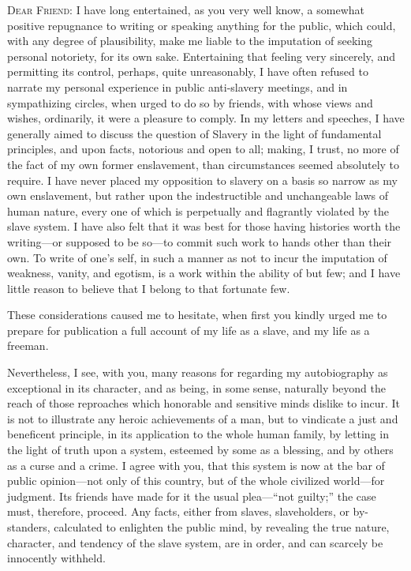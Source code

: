 \textsc{Dear Friend}: I have long entertained, as you very well know, a
somewhat positive repugnance to writing or speaking anything for the
public, which could, with any degree of plausibility, make me liable to
the imputation of seeking personal notoriety, for its own sake.
Entertaining that feeling very sincerely, and permitting its control,
perhaps, quite unreasonably, I have often refused to narrate my personal
experience in public anti-slavery meetings, and in sympathizing circles,
when urged to do so by friends, with whose views and wishes, ordinarily,
it were a pleasure to comply. In my letters and speeches, I have
generally aimed to discuss the question of Slavery in the light of
fundamental principles, and upon facts, notorious and open to all;
making, I trust, no more of the fact of my own former enslavement, than
circumstances seemed absolutely to require. I have never placed my
opposition to slavery on a basis so narrow as my own enslavement, but
rather upon the indestructible and unchangeable laws of human nature,
every one of which is perpetually and flagrantly violated by the slave
system. I have also felt that it was best for those having histories
worth the writing---or supposed to be so---to commit such work to hands
other than their own. To write of one's self, in such a manner as not to
incur the imputation of weakness, vanity, and egotism, is a work within
the ability of but few; and I have little reason to believe that I
belong to that fortunate few.

These considerations caused me to hesitate, when first you {}kindly
urged me to prepare for publication a full account of my life as a
slave, and my life as a freeman.

Nevertheless, I see, with you, many reasons for regarding my
autobiography as exceptional in its character, and as being, in some
sense, naturally beyond the reach of those reproaches which honorable
and sensitive minds dislike to incur. It is not to illustrate any heroic
achievements of a man, but to vindicate a just and beneficent principle,
in its application to the whole human family, by letting in the light of
truth upon a system, esteemed by some as a blessing, and by others as a
curse and a crime. I agree with you, that this system is now at the bar
of public opinion---not only of this country, but of the whole civilized
world---for judgment. Its friends have made for it the usual
plea---``not guilty;'' the case must, therefore, proceed. Any facts,
either from slaves, slaveholders, or by-standers, calculated to
enlighten the public mind, by revealing the true nature, character, and
tendency of the slave system, are in order, and can scarcely be
innocently withheld.


